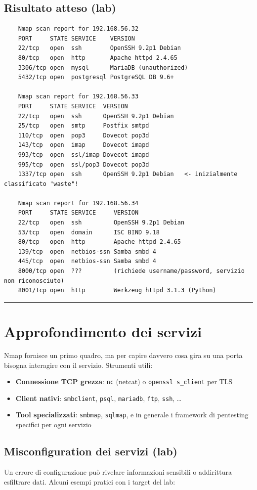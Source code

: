 \documentclass[12pt, a4paper]{report}
\begin{document}
\subsection{Risultato atteso (lab)}
\begin{lstlisting}
	Nmap scan report for 192.168.56.32
	PORT     STATE SERVICE    VERSION
	22/tcp   open  ssh        OpenSSH 9.2p1 Debian
	80/tcp   open  http       Apache httpd 2.4.65
	3306/tcp open  mysql      MariaDB (unauthorized)
	5432/tcp open  postgresql PostgreSQL DB 9.6+
	
	Nmap scan report for 192.168.56.33
	PORT     STATE SERVICE  VERSION
	22/tcp   open  ssh      OpenSSH 9.2p1 Debian
	25/tcp   open  smtp     Postfix smtpd
	110/tcp  open  pop3     Dovecot pop3d
	143/tcp  open  imap     Dovecot imapd
	993/tcp  open  ssl/imap Dovecot imapd
	995/tcp  open  ssl/pop3 Dovecot pop3d
	1337/tcp open  ssh      OpenSSH 9.2p1 Debian   <- inizialmente classificato "waste"!
	
	Nmap scan report for 192.168.56.34
	PORT     STATE SERVICE     VERSION
	22/tcp   open  ssh         OpenSSH 9.2p1 Debian
	53/tcp   open  domain      ISC BIND 9.18
	80/tcp   open  http        Apache httpd 2.4.65
	139/tcp  open  netbios-ssn Samba smbd 4
	445/tcp  open  netbios-ssn Samba smbd 4
	8000/tcp open  ???         (richiede username/password, servizio non riconosciuto)
	8001/tcp open  http        Werkzeug httpd 3.1.3 (Python)
\end{lstlisting}

\noindent\rule{\textwidth}{0.4pt}

\section{Approfondimento dei servizi}
Nmap fornisce un primo quadro, ma per capire davvero cosa gira su una porta bisogna interagire con il servizio. Strumenti utili:
\begin{itemize}
	\item \textbf{Connessione TCP grezza}: \texttt{nc} (netcat) o \texttt{openssl s\_client} per TLS
	\item \textbf{Client nativi}: \texttt{smbclient}, \texttt{psql}, \texttt{mariadb}, \texttt{ftp}, \texttt{ssh}, \dots
	\item \textbf{Tool specializzati}: \texttt{smbmap}, \texttt{sqlmap}, e in generale i framework di pentesting specifici per ogni servizio
\end{itemize}

\subsection{Misconfiguration dei servizi (lab)}
Un errore di configurazione può rivelare informazioni sensibili o addirittura esfiltrare dati. Alcuni esempi pratici con i target del lab:
\end{document}
